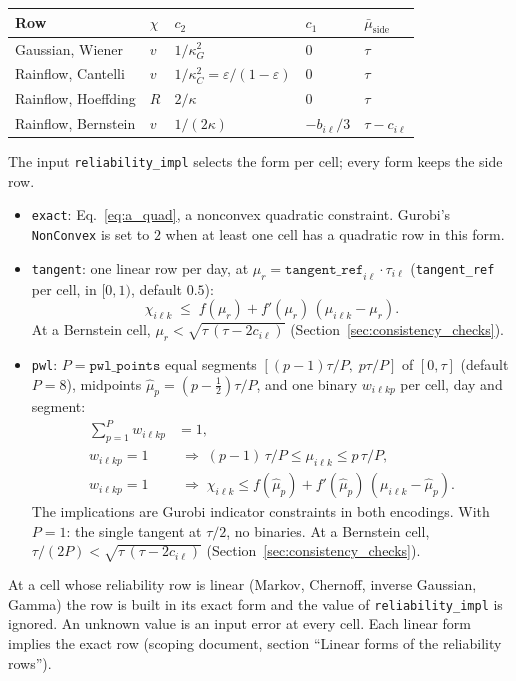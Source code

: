 \begingroup\small
\begin{longtable}{@{}lllll@{}}
\toprule
Row & $\chi$ & $c_2$ & $c_1$ & $\bar\mu_{\mathrm{side}}$ \\
\midrule
Gaussian, Wiener & $v$ & $1/\kappa_G^2$ & $0$ & $\tau$ \\
Rainflow, Cantelli & $v$ & $1/\kappa_C^2 = \varepsilon/(1-\varepsilon)$ & $0$ & $\tau$ \\
Rainflow, Hoeffding & $R$ & $2/\kappa$ & $0$ & $\tau$ \\
Rainflow, Bernstein & $v$ & $1/(2\kappa)$ & $-b_{i\ell}/3$ & $\tau - c_{i\ell}$ \\
\bottomrule
\end{longtable}
\endgroup

The input \texttt{reliability\_impl} selects the form per cell; every form keeps the
side row.
\begin{itemize}[leftmargin=1.5em]
  \item \texttt{exact}: Eq.~\eqref{eq:a_quad}, a nonconvex quadratic constraint.
        Gurobi's \texttt{NonConvex} is set to $2$ when at least one cell has a
        quadratic row in this form.
  \item \texttt{tangent}: one linear row per day, at
        $\mu_r = \texttt{tangent\_ref}_{i\ell}\cdot\tau_{i\ell}$ (\texttt{tangent\_ref}
        per cell, in $[0, 1)$, default $0.5$):
        \begin{equation}
          \chi_{i\ell k} \;\leq\; f(\mu_r) + f'(\mu_r)\,(\mu_{i\ell k} - \mu_r).
          \label{eq:a_tangent}
        \end{equation}
        At a Bernstein cell, $\mu_r < \sqrt{\tau\,(\tau - 2c_{i\ell})}$
        (Section~\ref{sec:consistency_checks}).
  \item \texttt{pwl}: $P = \texttt{pwl\_points}$ equal segments
        $[(p-1)\tau/P,\; p\tau/P]$ of $[0, \tau]$ (default $P = 8$), midpoints
        $\hat\mu_p = (p - \tfrac12)\tau/P$, and one binary $w_{i\ell kp}$ per cell,
        day and segment:
        \begin{align}
          \textstyle\sum_{p=1}^{P} w_{i\ell kp} &= 1, \label{eq:a_pwl_sum} \\
          w_{i\ell kp} = 1 &\;\Rightarrow\;
            (p-1)\,\tau/P \leq \mu_{i\ell k} \leq p\,\tau/P, \label{eq:a_pwl_seg} \\
          w_{i\ell kp} = 1 &\;\Rightarrow\;
            \chi_{i\ell k} \leq f(\hat\mu_p) + f'(\hat\mu_p)\,(\mu_{i\ell k} - \hat\mu_p).
            \label{eq:a_pwl_cap}
        \end{align}
        The implications are Gurobi indicator constraints in both encodings. With
        $P = 1$: the single tangent at $\tau/2$, no binaries. At a Bernstein cell,
        $\tau/(2P) < \sqrt{\tau\,(\tau - 2c_{i\ell})}$
        (Section~\ref{sec:consistency_checks}).
\end{itemize}
At a cell whose reliability row is linear (Markov, Chernoff, inverse Gaussian, Gamma)
the row is built in its exact form and the value of \texttt{reliability\_impl} is
ignored. An unknown value is an input error at every cell. Each linear form implies
the exact row (scoping document, section ``Linear forms of the reliability rows'').

